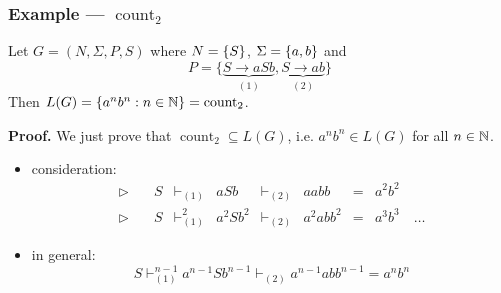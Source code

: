 \documentclass{beamer}
\DeclareMathOperator{\countL}{count}
\begin{document}
	\begin{frame} \frametitle{Example --- $\countL_2$}
		\begin{theorem}
			Let $G = (N,\Sigma, P, S)$ where $N = \left\{ S \right\}$, $\Sigma = \left\{ a,b \right\}$ and
			\begin{equation*}
			P = \big\{ \underbrace{S \to aSb}_{(1)}, \underbrace{S \to ab}_{(2)} \big\}
			\end{equation*} 
			Then $L(G) = \menge{a^n b^n : n \in \N} = \countL_2$.
		\end{theorem}
		\textbf{Proof.} We just prove that $\countL_2 \subseteq L(G)$, i.e. $a^n b^n \in L(G)$ for all $n \in \mathbb{N}$.
		\begin{itemize}
			\item consideration:
			\begin{equation*}
				\begin{array}{lrllllcl}
				\triangleright \quad & S &\vdash_{(1)} & aSb &\vdash_{(2)} & aabb &=& a^2 b^2 \\
				\triangleright \quad & S &\vdash_{(1)}^2 & a^2 S b^2 &\vdash_{(2)} & a^2 ab b^2 &=& a^3 b^3 \quad \dots
				\end{array}
			\end{equation*}
			\item in general:
			\begin{equation*}
				S \vdash_{(1)}^{n-1} a^{n-1} S b^{n-1} \vdash_{(2)} a^{n-1} a b b^{n-1} = a^n b^n
			\end{equation*}
		\end{itemize}
	\end{frame}
	
\end{document}
